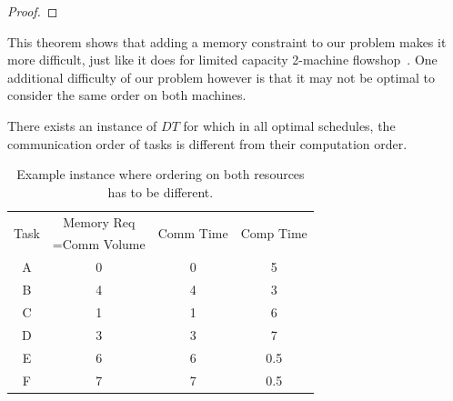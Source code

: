 \documentclass[sigconf]{acmart}
\begin{document}
\begin{proof}
	\end{proof}
	
	
	
	This theorem shows that adding a memory constraint to our
	problem makes it more difficult, just like it does for limited capacity 2-machine
	flowshop~\cite{Papadimitriou:1980:FSL:322203.322213}. One additional difficulty of our problem however 
	is that it may not be
	optimal to consider the same order on both machines.
	
	\begin{proposition}
		There exists an instance of $DT$ for which in all optimal
		schedules, the communication order of tasks is different
		from their computation order.
	\end{proposition}
	
	\begin{table}
		\begin{center}
			\begin{tabular}{|c|c|c|c|}
				\hline
				\multirow{2}{*}{Task} & Memory Req & \multirow{2}{*}{Comm Time} & \multirow{2}{*}{Comp Time}\\  
				&=Comm Volume && \\ \hline
				A & 0 & 0 & 5\\ \hline
				B & 4 & 4 & 3\\ \hline
				C & 1 & 1 & 6\\ \hline
				D & 3 & 3 & 7\\ \hline
				E & 6 & 6 & 0.5\\ \hline
				F & 7 & 7 & 0.5\\ \hline
			\end{tabular}
		\end{center}
		\caption{Example instance where ordering on both resources
			has to be different.}
		\label{table:different.order}
	\end{table}
	
\end{document}
